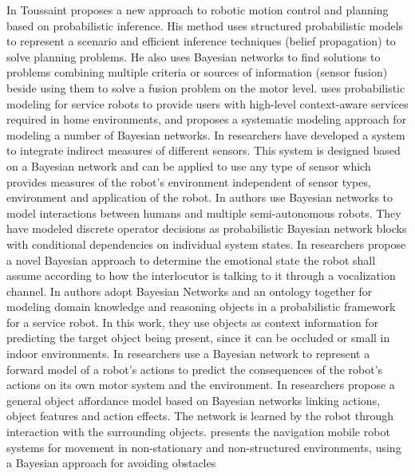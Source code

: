 \documentclass[11pt]{article}
\begin{document}
In \cite{toussaint:bayesian-motion-planning} Toussaint proposes a new approach
to robotic motion control and planning based on probabilistic inference. His
method uses structured probabilistic models to represent a scenario and
efficient inference techniques (belief propagation) to solve planning problems.
He also uses Bayesian networks to find solutions to problems combining multiple
criteria or sources of information (sensor fusion) beside using them to solve a
fusion problem on the motor level. \cite{park:bn-service-robot} uses
probabilistic modeling for service robots to provide users with high-level
context-aware services required in home environments, and proposes a systematic
modeling approach for modeling a number of Bayesian networks. In
\cite{orozco:multisensor-bn} researchers have developed a system to integrate
indirect measures of different sensors. This system is designed based on a
Bayesian network and can be applied to use any type of sensor which provides
measures of the robot's environment independent of sensor types, environment and
application of the robot. In \cite{bourgault:operator-multiple-robot} authors
use Bayesian networks to model interactions between humans and multiple
semi-autonomous robots. They have modeled discrete operator decisions as
probabilistic Bayesian network blocks with conditional dependencies on
individual system states. In \cite{prado:robot-emotion-bayesian} researchers
propose a novel Bayesian approach to determine the emotional state the robot
shall assume according to how the interlocutor is talking to it through a
vocalization channel. In \cite{song:bn-service-robot} authors adopt Bayesian
Networks and an ontology together for modeling domain knowledge and reasoning
objects in a probabilistic framework for a service robot. In this work, they use
objects as context information for predicting the target object being present,
since it can be occluded or small in indoor environments. In
\cite{dearden:forward-model-robot} researchers use a Bayesian network to
represent a forward model of a robot's actions to predict the consequences of
the robot's actions on its own motor system and the environment. In
\cite{montesano:affordances-bn} researchers propose a general object affordance
model based on Bayesian networks linking actions, object features and action
effects. The network is learned by the robot through interaction with the
surrounding objects. \cite{vladareanu:robot-naviation-bayesian} presents the
navigation mobile robot systems for movement in non-stationary and
non-structured environments, using a Bayesian approach for avoiding obstacles
\end{document}
